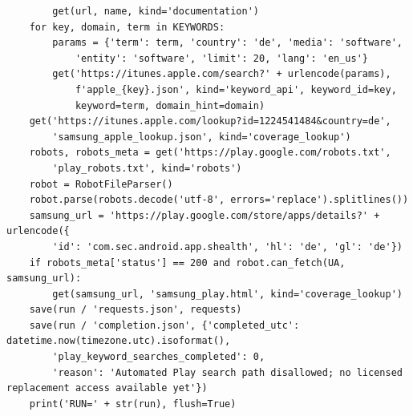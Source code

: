 \documentclass[10pt,a4paper]{article}
\begin{document}
\begin{lstlisting}
        get(url, name, kind='documentation')
    for key, domain, term in KEYWORDS:
        params = {'term': term, 'country': 'de', 'media': 'software',
            'entity': 'software', 'limit': 20, 'lang': 'en_us'}
        get('https://itunes.apple.com/search?' + urlencode(params),
            f'apple_{key}.json', kind='keyword_api', keyword_id=key,
            keyword=term, domain_hint=domain)
    get('https://itunes.apple.com/lookup?id=1224541484&country=de',
        'samsung_apple_lookup.json', kind='coverage_lookup')
    robots, robots_meta = get('https://play.google.com/robots.txt',
        'play_robots.txt', kind='robots')
    robot = RobotFileParser()
    robot.parse(robots.decode('utf-8', errors='replace').splitlines())
    samsung_url = 'https://play.google.com/store/apps/details?' + urlencode({
        'id': 'com.sec.android.app.shealth', 'hl': 'de', 'gl': 'de'})
    if robots_meta['status'] == 200 and robot.can_fetch(UA, samsung_url):
        get(samsung_url, 'samsung_play.html', kind='coverage_lookup')
    save(run / 'requests.json', requests)
    save(run / 'completion.json', {'completed_utc': datetime.now(timezone.utc).isoformat(),
        'play_keyword_searches_completed': 0,
        'reason': 'Automated Play search path disallowed; no licensed replacement access available yet'})
    print('RUN=' + str(run), flush=True)


\end{lstlisting}
\end{document}
